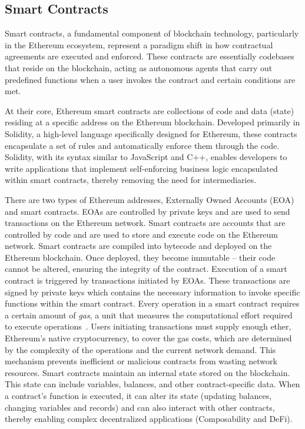 \subsection{Smart Contracts}

Smart contracts, a fundamental component of blockchain technology, particularly in the Ethereum ecosystem, represent a paradigm shift in how contractual agreements are executed and enforced. These contracts are essentially codebases that reside on the blockchain, acting as autonomous agents that carry out predefined functions when a user invokes the contract and certain conditions are met. 

At their core, Ethereum smart contracts are collections of code and data (state) residing at a specific address on the Ethereum blockchain. Developed primarily in Solidity, a high-level language specifically designed for Ethereum, these contracts encapsulate a set of rules and automatically enforce them through the code. Solidity, with its syntax similar to JavaScript and C++, enables developers to write applications that implement self-enforcing business logic encapsulated within smart contracts, thereby removing the need for intermediaries.

There are two types of Ethereum addresses, Externally Owned Accounts (EOA) and smart contracts. EOAs are controlled by private keys and are used to send transactions on the Ethereum network. Smart contracts are accounts that are controlled by code and are used to store and execute code on the Ethereum network. Smart contracts are compiled into bytecode and deployed on the Ethereum blockchain. Once deployed, they become immutable – their code cannot be altered, ensuring the integrity of the contract. Execution of a smart contract is triggered by transactions initiated by EOAs. These transactions are signed by private keys which contains the necessary information to invoke specific functions within the smart contract. Every operation in a smart contract requires a certain amount of \textit{gas}, a unit that measures the computational effort required to execute operations~\cite{gasethereumorg}. Users initiating transactions must supply enough ether, Ethereum's native cryptocurrency, to cover the gas costs, which are determined by the complexity of the operations and the current network demand. This mechanism prevents inefficient or malicious contracts from wasting network resources. Smart contracts maintain an internal state stored on the blockchain. This state can include variables, balances, and other contract-specific data. When a contract's function is executed, it can alter its state (\eg updating balances, changing variables and records) and can also interact with other contracts, thereby enabling complex decentralized applications (Composability and DeFi).


